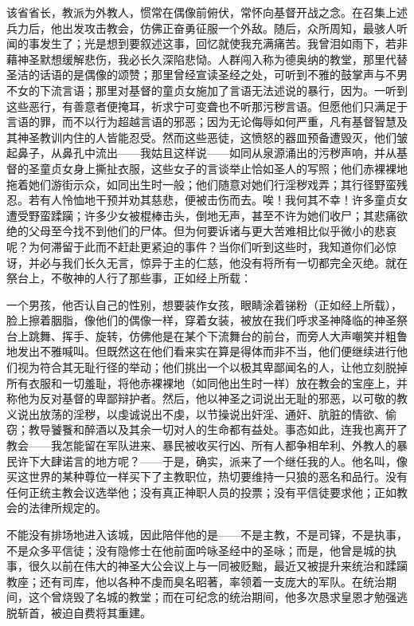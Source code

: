 该省省长，教派为外教人，惯常在偶像前俯伏，常怀向基督开战之念。在召集上述兵力后，他出发攻击教会，仿佛正奋勇征服一个外敌。随后，众所周知，最骇人听闻的事发生了；光是想到要叙述这事，回忆就使我充满痛苦。我曾泪如雨下，若非藉神圣默想缓解悲伤，我必长久深陷悲恸。人群闯入称为德奥纳的教堂，那里代替圣洁的话语的是偶像的颂赞；那里曾经宣读圣经之处，可听到不雅的鼓掌声与不男不女的下流言语；那里对基督的童贞女施加了言语无法述说的暴行，因为。一听到这些恶行，有善意者便掩耳，祈求宁可变聋也不听那污秽言语。但愿他们只满足于言语的罪，而不以行为超越言语的邪恶；因为无论侮辱如何严重，凡有基督智慧及其神圣教训内住的人皆能忍受。然而这些恶徒，这愤怒的器皿预备遭毁灭，他们皱起鼻子，从鼻孔中流出——我姑且这样说——如同从泉源涌出的污秽声响，并从基督的圣童贞女身上撕扯衣服，这些女子的言谈举止恰如圣人的写照；他们赤裸裸地拖着她们游街示众，如同出生时一般；他们随意对她们行淫秽戏弄；其行径野蛮残忍。若有人怜恤地干预并劝其慈悲，便被击伤而去。唉！我何其不幸！许多童贞女遭受野蛮蹂躏；许多少女被棍棒击头，倒地无声，甚至不许为她们收尸；其悲痛欲绝的父母至今找不到他们的尸体。但为何要诉诸与更大苦难相比似乎微小的悲哀呢？为何滞留于此而不赶赴更紧迫的事件？当你们听到这些时，我知道你们必惊讶，并必与我们长久无言，惊异于主的仁慈，他没有将所有一切都完全灭绝。就在祭台上，不敬神的人行了那些事，正如经上所载：\par

一个男孩，他否认自己的性别，想要装作女孩，眼睛涂着锑粉（正如经上所载），脸上擦着胭脂，像他们的偶像一样，穿着女装，被放在我们呼求圣神降临的神圣祭台上跳舞、挥手、旋转，仿佛他是在某个下流舞台的前台，而旁人大声嘲笑并粗鲁地发出不雅喊叫。但既然这在他们看来实在算是得体而非不当，他们便继续进行他们视为符合其无耻行径的举动；他们挑出一个以极其卑鄙闻名的人，让他立刻脱掉所有衣服和一切羞耻，将他赤裸裸地（如同他出生时一样）放在教会的宝座上，并称他为反对基督的卑鄙辩护者。然后，他以神圣之词说出无耻的邪恶，以可敬的教义说出放荡的淫秽，以虔诚说出不虔，以节操说出奸淫、通奸、肮脏的情欲、偷窃；教导饕餮和醉酒以及其余一切对人的生命都有益处。事态如此，连我也离开了教会——我怎能留在军队进来、暴民被收买行凶、所有人都争相牟利、外教人的暴民许下大肆诺言的地方呢？——于是，确实，派来了一个继任我的人。他名叫，像买这世界的某种尊位一样买下了主教职位，热切要维持一只狼的恶名和品行。没有任何正统主教会议选举他；没有真正神职人员的投票；没有平信徒要求他；正如教会的法律所规定的。\par

不能没有排场地进入该城，因此陪伴他的是——不是主教，不是司铎，不是执事，不是众多平信徒；没有隐修士在他前面吟咏圣经中的圣咏；而是，他曾是城的执事，很久以前在伟大的神圣大公会议上与一同被贬黜，最近又被提升来统治和蹂躏教座；还有司库，他以各种不虔而臭名昭著，率领着一支庞大的军队。在统治期间，这个曾烧毁了名城的教堂；而在可纪念的统治期间，他多次恳求皇恩才勉强逃脱斩首，被迫自费将其重建。\par

